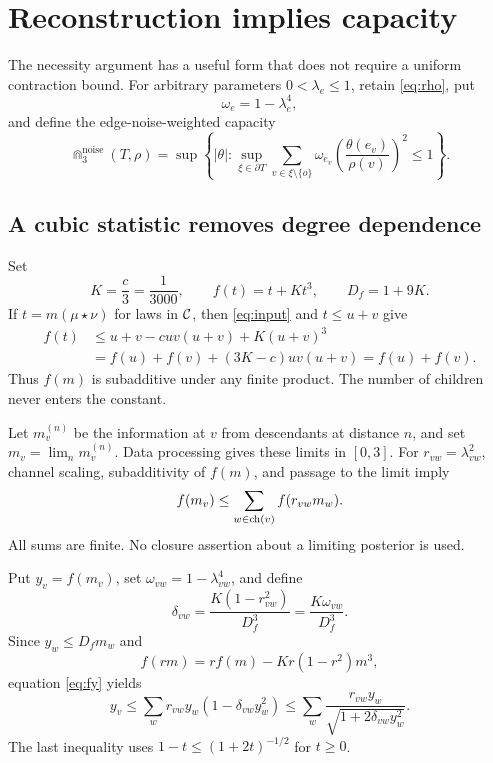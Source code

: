 \section{Reconstruction implies capacity}

The necessity argument has a useful form that does not require a uniform
contraction bound. For arbitrary parameters $0<\lambda_e\le1$, retain
\eqref{eq:rho}, put
\[
 \omega_e=1-\lambda_e^4,
\]
and define the edge-noise-weighted capacity
\begin{equation}\label{eq:weighted-capacity}
 \Cap_3^{\mathrm{noise}}(T,\rho)
 =\sup\left\{|\theta|:
 \sup_{\xi\in\partial T}
 \sum_{v\in\xi\setminus\{o\}}
 \omega_{e_v}\left(\frac{\theta(e_v)}{\rho(v)}\right)^2\le1
 \right\}.
\end{equation}

\subsection{A cubic statistic removes degree dependence}

Set
\begin{equation}\label{eq:f}
 K=\frac c3=\frac1{3000},\qquad f(t)=t+Kt^3,
 \qquad D_f=1+9K.
\end{equation}
If $t=m(\mu\star\nu)$ for laws in $\mathcal C$, then \eqref{eq:input} and
$t\le u+v$ give
\begin{align*}
 f(t)&\le u+v-cuv(u+v)+K(u+v)^3\\
 &=f(u)+f(v)+(3K-c)uv(u+v)=f(u)+f(v).
\end{align*}
Thus $f(m)$ is subadditive under any finite product. The number of children
never enters the constant.

Let $m_v^{(n)}$ be the information at $v$ from descendants at distance $n$,
and set $m_v=\lim_n m_v^{(n)}$. Data processing gives these limits in
$[0,3]$. For $r_{vw}=\lambda_{vw}^2$, channel scaling, subadditivity of
$f(m)$, and passage to the limit imply
\begin{equation}\label{eq:fy}
 f(m_v)\le\sum_{w\in\operatorname{ch}(v)}f(r_{vw}m_w).
\end{equation}
All sums are finite. No closure assertion about a limiting posterior is used.

Put $y_v=f(m_v)$, set $\omega_{vw}=1-\lambda_{vw}^4$, and define
\[
 \delta_{vw}=\frac{K(1-r_{vw}^2)}{D_f^3}
 =\frac{K\omega_{vw}}{D_f^3}.
\]
Since $y_w\le D_fm_w$ and
\[
 f(rm)=rf(m)-Kr(1-r^2)m^3,
\]
equation \eqref{eq:fy} yields
\begin{equation}\label{eq:edge-concave}
 y_v\le\sum_w r_{vw}y_w(1-\delta_{vw}y_w^2)
 \le\sum_w\frac{r_{vw}y_w}
                    {\sqrt{1+2\delta_{vw}y_w^2}}.
\end{equation}
The last inequality uses $1-t\le(1+2t)^{-1/2}$ for $t\ge0$.

